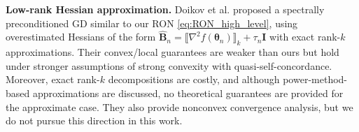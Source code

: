 \documentclass[11pt]{amsart}
\theoremstyle{plain}
\theoremstyle{definition}
\theoremstyle{remark}
\newcommand{\xmark}{\text{\ding{55}}}
\def\I{\mathbf{I}}
\def\B{\mathbf{B}}
\def\param{\boldsymbol{\theta}}
\def\I{\mathbf{I}}
\begin{document}
\noindent\textbf{Low-rank Hessian approximation.}
Doikov et al. \cite{doikov2024spectral} proposed a spectrally preconditioned GD similar to our RON \eqref{eq:RON_high_level}, using overestimated Hessians of the form $\hat{\B}_{n}=\llbracket \nabla^{2} f(\param_{n}) \rrbracket_{k}+\tau_{n}\I$ with exact rank-$k$ approximations. Their convex/local guarantees are weaker than ours but hold under stronger assumptions of strong convexity with quasi-self-concordance. Moreover, exact rank-$k$ decompositions are costly, and although power-method-based approximations are discussed, no theoretical guarantees are provided for the approximate case. They also provide nonconvex convergence analysis, but we do not pursue this direction in this work. 
\end{document}
